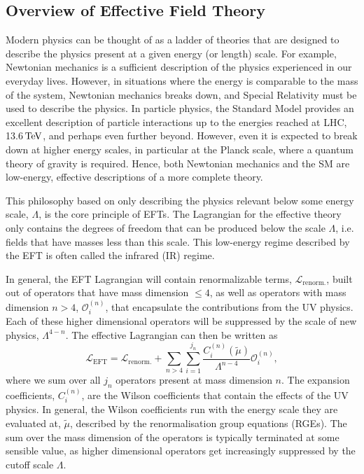 \subsection{Overview of Effective Field Theory}
\label{ch1:subsec:EFT_intro}

Modern physics can be thought of as a ladder of theories that are designed to describe the physics present at a given energy (or length) scale. For example, Newtonian mechanics is a sufficient description of the physics experienced in our everyday lives. However, in situations where the energy is comparable to the mass of the system, Newtonian mechanics breaks down, and Special Relativity must be used to describe the physics. In particle physics, the Standard Model provides an excellent description of particle interactions up to the energies reached at LHC, 13.6${\rm \,TeV}$, and perhaps even further beyond. However, even it is expected to break down at higher energy scales, in particular at the Planck scale, where a quantum theory of gravity is required. Hence, both Newtonian mechanics and the SM are low-energy, effective descriptions of a more complete theory.

This philosophy based on only describing the physics relevant below some energy scale, $\Lambda$, is the core principle of EFTs. The Lagrangian for the effective theory only contains the degrees of freedom that can be produced below the scale $\Lambda$, i.e. fields that have masses less than this scale. This low-energy regime described by the EFT is often called the infrared (IR) regime. 

In general, the EFT Lagrangian will contain renormalizable terms, $\mathcal{L}_\mathrm{renorm.}$,  built out of operators that have mass dimension $\leq 4$, as well as operators with mass dimension $n> 4$, $\mathcal{O}_i^{(n)}$, that encapsulate the contributions from the UV physics. Each of these higher dimensional operators will be suppressed by the scale of new physics, $\Lambda^{4-n}$. 
The effective Lagrangian can then be written as
\begin{equation}
    \mathcal{L}_\mathrm{EFT} = \mathcal{L}_\mathrm{renorm.} +  \sum_{n>4}   \sum_{i = 1}^{j_n} \frac{C_i^{(n)} (\tilde{\mu})}{\Lambda^{n-4}}\mathcal{O}_i^{(n)},
    \label{ch1:eq:EFT_Lagrangian}
\end{equation}
where we sum over all $j_n$ operators present at mass dimension $n$. The expansion coefficients, $C_i^{(n)}$, are the Wilson coefficients that contain the effects of the UV physics. In general, the Wilson coefficients run with the energy scale they are evaluated at, $\tilde{\mu}$, described by the renormalisation group equations (RGEs).
The sum over the mass dimension of the operators is typically terminated at some sensible value, as higher dimensional operators get increasingly suppressed by the cutoff scale $\Lambda$.

